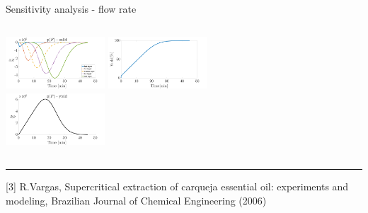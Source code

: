 \documentclass[8pt]{beamer}
\begin{document}
\begin{frame}[fragile]{Sensitivity analysis - flow rate}
\begin{columns}[t]
		\includegraphics[width=3.7cm,height=2.0cm]{Figures/Sensitivity/Plots/3_SS_R_F.png}
		\centering
		\includegraphics[width=3.7cm,height=2.0cm]{Figures/Sensitivity/Yield.png}\\
		\includegraphics[width=3.7cm,height=2.0cm]{Figures/Sensitivity/Plots/1_SS_R_F.png}
	\end{columns}
\hrule
\footnotesize{[3] R.Vargas, Supercritical extraction of carqueja essential oil: experiments and modeling, Brazilian Journal of Chemical Engineering (2006) }
\end{frame}
	
\end{document}
